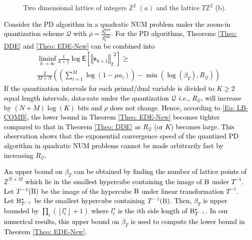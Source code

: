 \documentclass[10pt,twocolumn,twoside]{IEEEtran}
\begin{document}
\begin{figure}[!t]
\caption{Two dimensional lattice of integers ${\ensuremath{{\ensuremath{\mathbb{{Z}}}}}}^2$ $(a)$ and the lattice $T{\ensuremath{{\ensuremath{\mathbb{{Z}}}}}}^2$ (b).} \label{F-lattice}
\end{figure}

\textcolor{black}{Consider the PD algorithm in a quadratic NUM problem under the zoom-in quantization scheme $\mathcal{Q}$ with $\rho=\frac{\delta^{\max}_k}{\delta^{\min}_k}$. For the PD algorithms, Theorems \ref{Theo: DDE} and \ref{Theo: EDE-New} can be combined into
\begin{align}\label{Eq: LB-COMB}
&\liminf_{k\rightarrow\infty}\frac{1}{k+1}\log{{\ensuremath{\mathsf{E}\left[{{\left\Vert{{\ensuremath{\boldsymbol{{\epsilon}}}}_{k+1}}\right\Vert_{{2}}}^2} \right]}}}\geq \nonumber\\
&\frac{2}{M+N}{\left({{\left({\sum_{i=1}^M {\ensuremath{\log{\left({{1-\mu a_i}}\right)}}}}\right)}-\min{\left({{\ensuremath{\log{\left({{\beta_T}}\right)}}},R_{\mathcal{Q}}}\right)} }\right)}
\end{align}
 If the quantization intervals for each primal/dual variable is divided to $K\geq 2$ equal length intervals, data-rate under the quantization $\mathcal{Q}$ \emph{i.e.,} $R_{\mathcal{Q}}$,  will increase by ${\left({N+M}\right)}{\ensuremath{\log{\left({{K}}\right)}}}$ bits and $\rho$ does not change. Hence, according to \eqref{Eq: LB-COMB}, the lower bound in Theorem \ref{Theo: EDE-New} becomes tighter compared to that in Theorem \ref{Theo: DDE} as $R_{\mathcal{Q}}$ (or $K$) becomes large. This observation shows that the exponential convergence speed of the quantized PD algorithm in quadratic NUM problems cannot be made arbitrarily fast by increasing $R_{\mathcal{Q}}$. }

\textcolor{black}{An upper bound on $\beta_T$ can be obtained by finding the number of lattice points of ${\ensuremath{{\ensuremath{\mathbb{{Z}}}}}}^{N+M}$ which lie in the smallest hypercube containing the image of ${\rm B}$ under $T^{-1}$. Let $T^{-1}{\left({\rm B}\right)}$ be the image of the hypercube ${\rm B}$ under linear transformation $T^{-1}$. Let ${\rm B}^\star_{T^{-1}}$ be the smallest hypercube containing $T^{-1}{\left({\rm B}\right)}$. Then, $\beta_T$ is upper bounded by $\prod_{i}{\left({\left\lfloor l^\star_i\right\rfloor+1}\right)}$ where $l^\star_i$ is the $i$th side length of ${\rm B}^\star_{T^{-1}}$. In our numerical results, this upper bound on $\beta_T$ is used to compute the lower bound in Theorem \ref{Theo: EDE-New}.}
\end{document}
